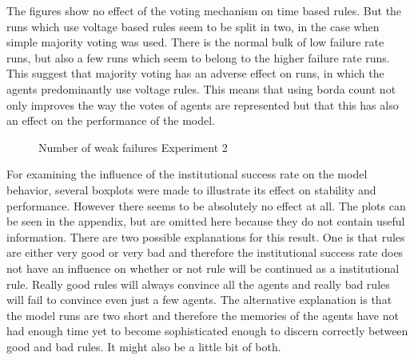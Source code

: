 \documentclass[a4paper]{article}
\begin{document}
The figures show no effect of the voting mechanism on time based rules.
But  the runs which use voltage based rules seem to be split in two, in the case when simple majority voting was used. 
There is the normal bulk of low failure rate runs, but also a few runs which seem to belong to the higher failure rate runs. 
This suggest that majority voting has an adverse effect on runs, in which the agents predominantly use voltage rules. 
This means that using borda count not only improves the way the votes of agents are represented but that this has also an 
effect on the performance of the model.
\begin{figure}[!ht]
\caption{Number of weak failures Experiment 2}
\label{b_weak}
\end{figure}

For examining the influence of the institutional success rate on the model behavior, several boxplots were made to illustrate its 
effect on stability and performance. However there seems to be absolutely no effect at all. The plots can be seen in the appendix, but are
omitted here because they do not contain useful information. There are two possible explanations for this result. One is that 
rules are either very good or very bad and therefore the institutional success rate does not have an influence on 
whether or not rule will be continued as a institutional rule. Really good rules will always convince all the agents and really bad 
rules will fail to convince even just a few agents. The alternative explanation is that the model runs are two short and therefore 
the memories of the agents have not had enough time yet to become sophisticated enough to discern correctly between good and bad rules.
It might also be a little bit of both.
\clearpage
\end{document}
